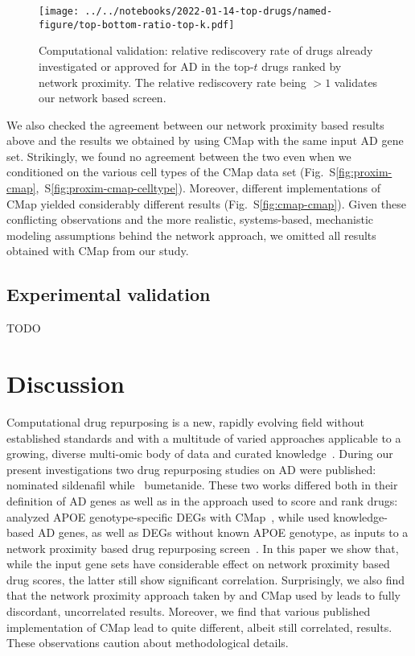 \documentclass[letterpaper]{article}
\begin{document}
\begin{figure}
\texttt{[image: ../../notebooks/2022-01-14-top-drugs/named-figure/top-bottom-ratio-top-k.pdf]}
\caption{
Computational validation: relative rediscovery rate of drugs already investigated or
approved for AD in the top-$t$ drugs ranked by network proximity.  The relative
rediscovery rate being $>1$ validates our network based screen.
}
\label{fig:ad-drug-rediscovery}
\end{figure}

We also checked the agreement between our network proximity based results
above and the results we obtained by using CMap with the same input AD gene
set.  Strikingly, we found no agreement between the two even when we
conditioned on the various cell types of the CMap data set
(Fig.~S\ref{fig:proxim-cmap},~S\ref{fig:proxim-cmap-celltype}).  Moreover,
different implementations of CMap yielded considerably different results
(Fig.~S\ref{fig:cmap-cmap}).  Given these conflicting observations and the
more realistic, systems-based, mechanistic modeling assumptions behind the
network approach, we omitted all results obtained with CMap from our study.

\subsection{Experimental validation}

TODO

\section{Discussion}

Computational drug repurposing is a new, rapidly evolving field without
established standards and with a multitude of varied approaches applicable to
a growing, diverse multi-omic body of data and curated
knowledge~\citep{Pushpakom2019}.  During our present investigations two drug
repurposing studies on AD were published: \cite{Fang2021} nominated sildenafil
while~\cite{Taubes2021} bumetanide.  These two works differed both in their
definition of AD genes as well as in the approach used to score and rank
drugs: \cite{Taubes2021} analyzed APOE genotype-specific DEGs with
CMap~\citep{Lamb2006}, while \cite{Fang2021} used knowledge-based AD genes, as
well as DEGs without known APOE genotype, as inputs to a network proximity
based drug repurposing screen~\citep{Cheng2018}.  In this paper we show that,
while the input gene sets have considerable effect on network proximity based
drug scores, the latter still show significant correlation.  Surprisingly, we
also find that the network proximity approach taken by \cite{Fang2021} and
CMap used by \cite{Taubes2021} leads to fully discordant, uncorrelated
results.  Moreover, we find that various published implementation of CMap lead
to quite different, albeit still correlated, results.  These observations
caution about methodological details.
\end{document}
